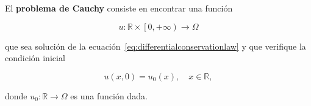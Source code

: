 \begin{frame}
    \frametitle{\secname}

    \begin{definition}
        El \textbf{problema de Cauchy} consiste en encontrar una función

        \begin{equation*}
            u\colon\mathbb{R}\times
            \left[0,+\infty\right)\longrightarrow
            \Omega
        \end{equation*}

        que sea solución de la
        ecuación~\eqref{eq:differentialconservationlaw} y que verifique la
        condición inicial

        \begin{equation}\label{eq:initialcondition}
            u\left(x,0\right)=
            u_{0}\left(x\right),\quad
            x\in\mathbb{R},
        \end{equation}

        donde
        \begin{math}
            u_{0}\colon\mathbb{R}\to\Omega
        \end{math}
        es una función dada.
    \end{definition}
\end{frame}

